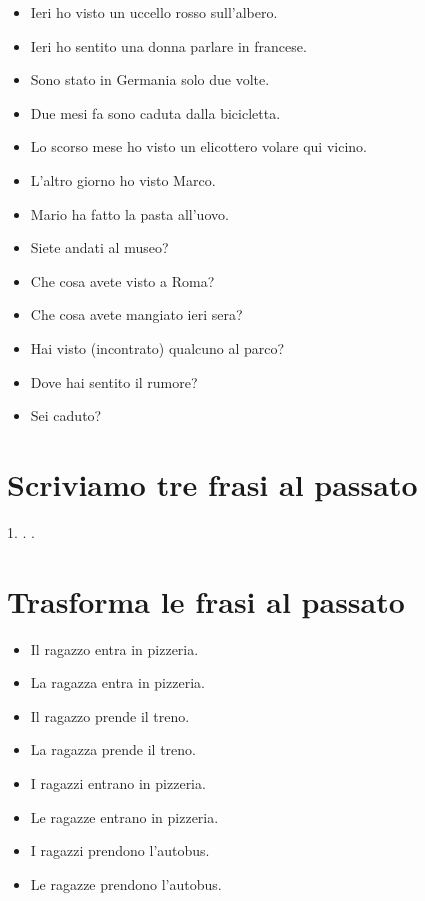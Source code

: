 \documentclass[letter,11pt]{article}
\begin{document}
\vskip 0.5in


\begin{multicols}{2}
\begin{itemize}
    \item Ieri ho visto un uccello rosso sull'albero.
    \item Ieri ho sentito una donna parlare in francese.
    \item Sono stato in Germania solo due volte.
    \item Due mesi fa sono caduta dalla bicicletta.
    \item Lo scorso mese ho visto un elicottero volare qui vicino.
    \item L'altro giorno ho visto Marco.
    \item Mario ha fatto la pasta all'uovo.
    \item Siete andati al museo?
    \item Che cosa avete visto a Roma?
    \item Che cosa avete mangiato ieri sera?
    \item Hai visto (incontrato) qualcuno al parco?
    \item Dove hai sentito il rumore?
    \item Sei caduto?

\end{itemize}
\end{multicols}

\vskip 0.2in
\section*{Scriviamo tre frasi al passato}
\vskip 0.2in

1. \hrulefill
\vskip 0.2in
. \hrulefill
\vskip 0.2in
. \hrulefill
\vskip 0.5in

\vskip 0.2in
\section*{Trasforma le frasi al passato}
\vskip 0.2in

\begin{multicols}{2}
\begin{itemize}

    \item Il ragazzo entra in pizzeria.
    \item La ragazza entra in pizzeria.
    \item Il ragazzo prende il treno.
    \item La ragazza prende il treno.
    \item I ragazzi entrano in pizzeria.
    \item Le ragazze entrano in pizzeria.
    \item I ragazzi prendono l’autobus.
    \item Le ragazze prendono l’autobus.

\end{itemize}
\end{multicols}
\vskip 0.2in
\end{document}

